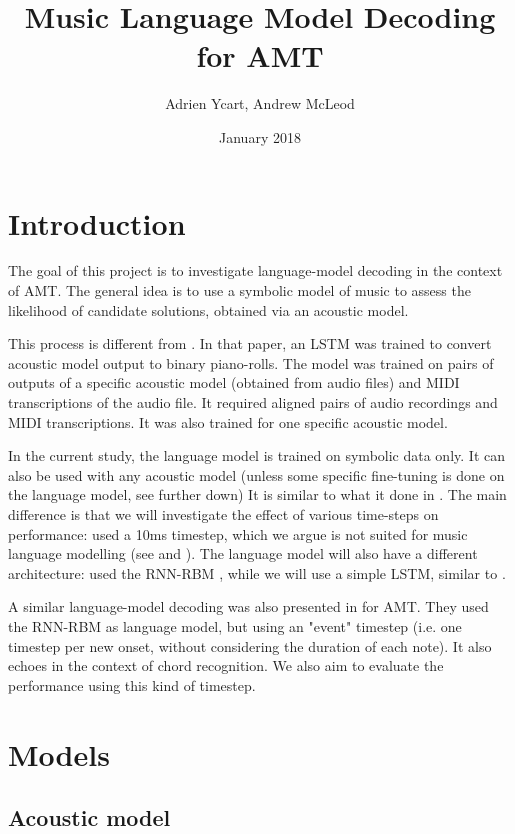 \documentclass{article}
\title{Music Language Model Decoding for AMT}
\author{Adrien Ycart, Andrew McLeod}
\date{January 2018}
\begin{document}
\maketitle

\section{Introduction}

The goal of this project is to investigate language-model decoding in the context of AMT.
The general idea is to use a symbolic model of music to assess the likelihood of candidate solutions, obtained via an acoustic model.

This process is different from \cite{ycart2018polyphonic}.
In that paper, an LSTM was trained to convert acoustic model output to binary piano-rolls.
The model was trained on pairs of outputs of a specific acoustic model (obtained from audio files) and MIDI transcriptions of the audio file.
It required aligned pairs of audio recordings and MIDI transcriptions.
It was also trained for one specific acoustic model.

In the current study, the language model is trained on symbolic data only.
It can also be used with any acoustic model (unless some specific fine-tuning is done on the language model, see further down)
It is similar to what it done in \cite{sigtia2016end}.
The main difference is that we will investigate the effect of various time-steps on performance:
 \cite{sigtia2016end} used a 10ms timestep, which we argue is not suited for music language modelling (see \cite{Ycart2017} and \cite{Korzeniowski2017}).
The language model will also have a different architecture: 
\cite{sigtia2016end} used the RNN-RBM \cite{Boulanger-Lewandowski2012}, while we will use a simple LSTM, similar to \cite{Ycart2017}.

A similar language-model decoding was also presented in \cite{app8030470} for AMT.
They used the RNN-RBM as language model, but using an "event" timestep (i.e. one timestep per new onset, without considering the duration of each note).
It also echoes \cite{Korzeniowski2018} in the context of chord recognition.
We also aim to evaluate the performance using this kind of timestep.

\section{Models}

\subsection{Acoustic model}
\end{document}
